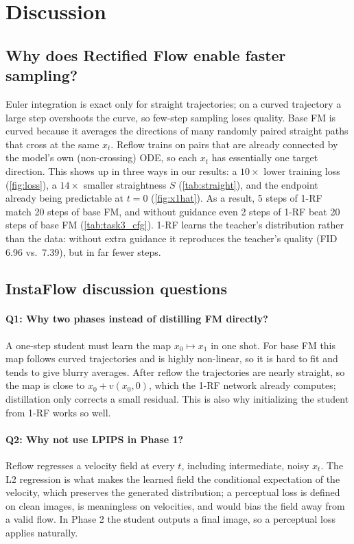 \section{Discussion}
\label{sec:discussion}

\subsection{Why does Rectified Flow enable faster sampling?}
Euler integration is exact only for straight trajectories; on a curved trajectory a large step overshoots the curve, so few-step sampling loses quality.
Base FM is curved because it averages the directions of many randomly paired straight paths that cross at the same $x_t$.
Reflow trains on pairs that are already connected by the model's own (non-crossing) ODE, so each $x_t$ has essentially one target direction.
This shows up in three ways in our results: a $10\times$ lower training loss (\cref{fig:loss}), a $14\times$ smaller straightness $S$ (\cref{tab:straight}), and the endpoint already being predictable at $t=0$ (\cref{fig:x1hat}).
As a result, 5 steps of 1-RF match 20 steps of base FM, and without guidance even 2 steps of 1-RF beat 20 steps of base FM (\cref{tab:task3_cfg}).
1-RF learns the teacher's distribution rather than the data: without extra guidance it reproduces the teacher's quality (FID 6.96 vs.\ 7.39), but in far fewer steps.

\subsection{InstaFlow discussion questions}
\paragraph{Q1: Why two phases instead of distilling FM directly?}
A one-step student must learn the map $x_0\mapsto x_1$ in one shot.
For base FM this map follows curved trajectories and is highly non-linear, so it is hard to fit and tends to give blurry averages.
After reflow the trajectories are nearly straight, so the map is close to $x_0+v(x_0,0)$, which the 1-RF network already computes; distillation only corrects a small residual.
This is also why initializing the student from 1-RF works so well.

\paragraph{Q2: Why not use LPIPS in Phase 1?}
Reflow regresses a velocity field at every $t$, including intermediate, noisy $x_t$.
The L2 regression is what makes the learned field the conditional expectation of the velocity, which preserves the generated distribution; a perceptual loss is defined on clean images, is meaningless on velocities, and would bias the field away from a valid flow.
In Phase 2 the student outputs a final image, so a perceptual loss applies naturally.

